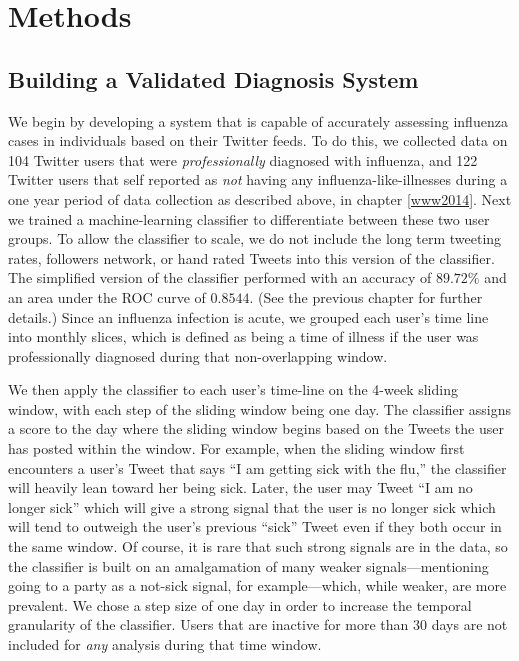 \section{Methods}
\subsection{Building a Validated Diagnosis System}
\label{sec:diagnosissystem}
We begin by developing a system that is capable of accurately assessing influenza cases in individuals based on their Twitter feeds. To do this, we collected data on 104 Twitter users that were \emph{professionally} diagnosed with influenza, and 122 Twitter users that self reported as \emph{not} having any influenza-like-illnesses during a one year period of data collection as described above, in chapter \ref{www2014}.  Next we trained a machine-learning classifier to differentiate between these two user groups. To allow the classifier to scale, we do not include the long term tweeting rates, followers network, or hand rated Tweets into this version of the classifier. The simplified version of the classifier performed with an accuracy of \(89.72\%\) and an area under the ROC curve of \(0.8544\). (See the previous chapter for further details.) Since an influenza infection is acute, we grouped each user's time line into monthly slices, which is defined as being a time of illness if the user was professionally diagnosed during that non-overlapping window. 

We then apply the classifier to each user's time-line on the 4-week sliding window, with each step of the sliding window being one day. The classifier assigns a score to the day where the sliding window begins based on the Tweets the user has posted within the window. For example, when the sliding window first encounters a user's Tweet that says ``I am getting sick with the flu,'' the classifier will heavily lean toward her being sick. Later, the user may Tweet ``I am no longer sick'' which will give a strong signal that the user is no longer sick which will tend to outweigh the user's previous ``sick'' Tweet even if they both occur in the same window. Of course, it is rare that such strong signals are in the data, so the classifier is built on an amalgamation of many weaker signals---mentioning going to a party as a not-sick signal, for example---which, while weaker, are more prevalent. We chose a step size of one day in order to increase the temporal granularity of the classifier. Users that are inactive for more than 30 days are not included for \emph{any} analysis during that time window.

